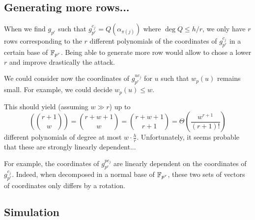 \documentclass[12pt,a4paper,titlepage]{article}
\begin{document}
\subsection{Generating more rows...}
When we find $g_{p^r}$ such that $g_{p^r}^{c_j} = Q(\alpha_{\pi(j)})$ where $\deg Q \leq h/r$, we only have $r$ rows corresponding to the $r$ different polynomials of the coordinates of $g_{p^r}^{c_j}$ in a certain base of $\mathbb{F}_{p^r}$. Being able to generate more row would allow to chose a lower $r$ and improve drastically the attack.

We could consider now the coordinates of $g_{p^r}^{u c_j}$ for $u$ such that $w_p(u)$ remains small. For example, we could decide $w_p(u) \leq w$.

This should yield (assuming $w \gg r$) up to
$$ \left( \binom{r+1}{w} \right) = \binom{r+w+1}{w} = \binom{r+w+1}{r+1} = \Theta\left(\frac{w^{r+1}}{(r+1)!}\right) $$
different polynomials of degree at most $w \cdot \frac{h}{r}$.
Unfortunately, it seems probable that these are strongly linearly dependent...

For example, the coordinates of $g_{p^r}^{p c_j}$ are linearly dependent on the coordinates of $g_{p^r}^{c_j}$. Indeed, when decomposed in a normal base of $\mathbb{F}_{p^r}$, these two sets of vectors of coordinates only differs by a rotation.


\subsection{Simulation}
\end{document}
